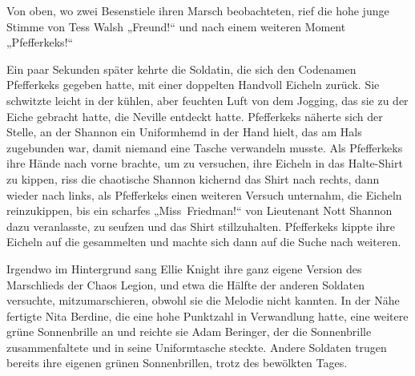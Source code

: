 Von oben, wo zwei Besenstiele ihren Marsch beobachteten, rief die hohe junge Stimme von Tess Walsh „Freund!“ und nach einem weiteren Moment „Pfefferkeks!“

Ein paar Sekunden später kehrte die Soldatin, die sich den Codenamen Pfefferkeks gegeben hatte, mit einer doppelten Handvoll Eicheln zurück. Sie schwitzte leicht in der kühlen, aber feuchten Luft von dem Jogging, das sie zu der Eiche gebracht hatte, die Neville entdeckt hatte. Pfefferkeks näherte sich der Stelle, an der Shannon ein Uniformhemd in der Hand hielt, das am Hals zugebunden war, damit niemand eine Tasche verwandeln musste. Als Pfefferkeks ihre Hände nach vorne brachte, um zu versuchen, ihre Eicheln in das Halte-Shirt zu kippen, riss die chaotische Shannon kichernd das Shirt nach rechts, dann wieder nach links, als Pfefferkeks einen weiteren Versuch unternahm, die Eicheln reinzukippen, bis ein scharfes „Miss~Friedman!“ von Lieutenant Nott Shannon dazu veranlasste, zu seufzen und das Shirt stillzuhalten. Pfefferkeks kippte ihre Eicheln auf die gesammelten und machte sich dann auf die Suche nach weiteren.

Irgendwo im Hintergrund sang Ellie Knight ihre ganz eigene Version des Marschlieds der Chaos Legion, und etwa die Hälfte der anderen Soldaten versuchte, mitzumarschieren, obwohl sie die Melodie nicht kannten. In der Nähe fertigte Nita Berdine, die eine hohe Punktzahl in Verwandlung hatte, eine weitere grüne Sonnenbrille an und reichte sie Adam Beringer, der die Sonnenbrille zusammenfaltete und in seine Uniformtasche steckte. Andere Soldaten trugen bereits ihre eigenen grünen Sonnenbrillen, trotz des bewölkten Tages.

